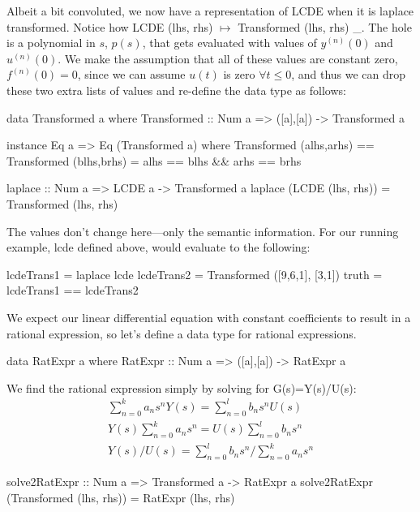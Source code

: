 Albeit a bit convoluted, we now have a representation of LCDE when it is laplace transformed.
Notice how LCDE (lhs, rhs) $\mapsto$ Transformed (lhs, rhs) \_. The hole is a polynomial in $s$, $p(s)$, that gets evaluated with values of $y^{(n)}(0)$ and $u^{(n)}(0)$. We make the assumption that all of these values are constant zero, $f^{(n)}(0)=0$, since we can assume $u(t)$ is zero $\forall t\leq 0$, and thus we can drop these two extra lists of values and re-define the data type as follows:

\begin{code}
data Transformed a where
  Transformed :: Num a => ([a],[a]) -> Transformed a

instance Eq a => Eq (Transformed a) where
  Transformed (alhs,arhs) == Transformed (blhs,brhs) = alhs == blhs && arhs == brhs

laplace :: Num a => LCDE a -> Transformed a
laplace (LCDE (lhs, rhs)) = Transformed (lhs, rhs)
\end{code}

The values don't change here---only the semantic information.
For our running example, lcde defined above, would evaluate to the following:
\begin{code}
lcdeTrans1 = laplace lcde
lcdeTrans2 = Transformed ([9,6,1], [3,1])
truth = lcdeTrans1 == lcdeTrans2
\end{code}

We expect our linear differential equation with constant coefficients to result
in a rational expression, so let's define a data type for rational expressions.

\begin{code}
data RatExpr a where
  RatExpr :: Num a => ([a],[a]) -> RatExpr a
\end{code}

We find the rational expression simply by solving for G(s)=Y(s)/U(s):
\begin{gather}
\sum\limits^{k}_{n=0}{a_n s^n Y(s)} = \sum\limits^{l}_{n=0}{b_n s^n U(s)}\\
Y(s)\sum\limits^{k}_{n=0}{a_n s^n} = U(s)\sum\limits^{l}_{n=0}{b_n s^n}\\
Y(s)/U(s) = \sum\limits^{l}_{n=0}{b_n s^n}/\sum\limits^{k}_{n=0}{a_n s^n}
\end{gather}

\begin{code}
solve2RatExpr :: Num a => Transformed a -> RatExpr a
solve2RatExpr (Transformed (lhs, rhs)) = RatExpr (lhs, rhs)
\end{code}

